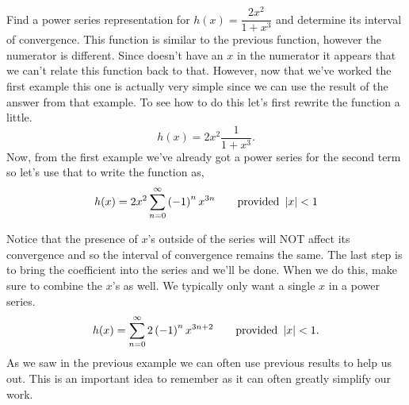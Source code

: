 \begin{example}\label{ex_power_numerator}%
Find a power series representation for $h(x)=\dfrac{2x^2}{1+x^3}$ and determine its interval of convergence.
\solution
This function is similar to the previous function, however the numerator is different.  Since  doesn't have an $x$ in the numerator it appears that we can't relate this function back to that.  However, now that we've worked the first example this one is actually very simple since we can use the result of the answer from that example.  To see how to do this let's first rewrite the function a little. 
\[h(x)=2x^2\frac1{1+x^3}.\]
Now, from the first example we've already got a power series for the second term so let's use that to write the function as, 
\[
h(x)=2x^2\sum_{n=0}^\infty\left( -1 \right)^n x^{3n} \qquad\text{provided }\left\lvert x \right\rvert<1
\]

Notice that the presence of $x$'s outside of the series will NOT affect its convergence and so the interval of convergence remains the same.  
The last step is to bring the coefficient into the series and we'll be done.  When we do this, make sure to combine the $x$'s as well.  We typically only want a single $x$ in a power series.
\[
h(x)=\sum_{n=0}^\infty 2\left( -1 \right)^n x^{3n+2} \qquad\text{provided }\left\lvert x \right\rvert<1.
\]
As we saw in the previous example we can often use previous results to help us out.  This is an important idea to remember as it can often greatly simplify our work.
\end{example}

